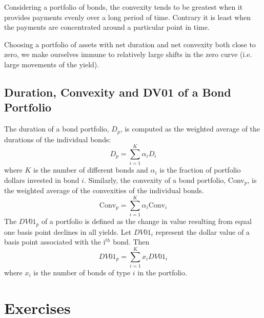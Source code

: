 Considering a portfolio of bonds, the convexity tends to be greatest when it provides payments evenly over a long period of time. Contrary it is least when the payments are concentrated around a particular point in time. 

Choosing a portfolio of assets with net duration and net convexity both close to zero, we make ourselves immune to relatively large shifts in the zero curve (i.e. large movements of the yield).

\subsection{Duration, Convexity and DV01 of a Bond Portfolio}
The duration of a bond portfolio, $D_p$, is computed as the weighted average of the durations of the individual
bonds:
\begin{equation}
D_p = \sum_{i=1}^{K} \alpha_i D_i
\end{equation}
where $K$ is the number of different bonds and $\alpha_i$ is the fraction of portfolio dollars invested in bond $i$. Similarly, the convexity of a bond portfolio, Conv$_p$, is the weighted average of the convexities of the individual bonds.
\begin{equation}
\textrm{Conv}_p = \sum^{K}_{i=1} \alpha_i \textrm{Conv}_i
\end{equation}
The $DV01_p$ of a portfolio is defined as the change in value resulting from equal one basis point declines in all yields. Let $DV01_i$ represent the dollar value of a basis point associated with the i$^{th}$ bond. Then
\begin{equation}
DV01_p = \sum^{K}_{i=1}x_i DV01_i
\end{equation}
where $x_i$ is the number of bonds of type $i$ in the portfolio.

\section*{Exercises}
%
